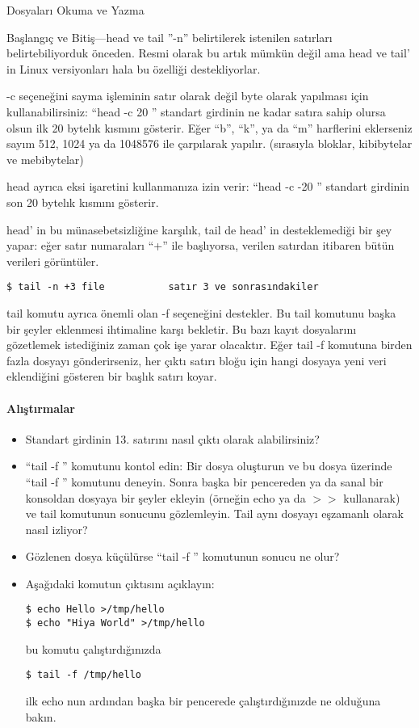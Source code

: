 \begin{section}{Dosyaları Okuma ve Yazma}
\begin{subsection}{Başlangıç ve Bitiş—head ve tail}
”-n” belirtilerek istenilen satırları belirtebiliyorduk önceden. Resmi olarak bu artık mümkün değil ama head ve tail' in Linux versiyonları hala bu özelliği destekliyorlar.

-c seçeneğini sayma işleminin satır olarak değil byte olarak yapılması için kullanabilirsiniz: 
“head -c 20 ” standart girdinin ne kadar satıra sahip olursa olsun ilk 20 bytelık kısmını gösterir. Eğer “b”, “k”, ya da “m” harflerini eklerseniz sayım 512, 1024 ya da 1048576 ile çarpılarak yapılır. (sırasıyla bloklar, kibibytelar ve mebibytelar)

head ayrıca eksi işaretini kullanmanıza izin verir: “head -c -20 ” standart girdinin son 20 bytelık kısmını gösterir.

head' in bu münasebetsizliğine karşılık, tail de head' in desteklemediği bir şey yapar: eğer satır numaraları “+” ile başlıyorsa, verilen satırdan itibaren bütün verileri görüntüler.
\begin{verbatim}
$ tail -n +3 file           satır 3 ve sonrasındakiler
\end{verbatim}

tail komutu ayrıca önemli olan -f seçeneğini destekler. Bu tail komutunu başka bir şeyler eklenmesi ihtimaline karşı bekletir. Bu bazı kayıt dosyalarını gözetlemek istediğiniz zaman çok işe yarar olacaktır. Eğer tail -f komutuna birden fazla dosyayı gönderirseniz, her çıktı satırı bloğu için hangi dosyaya yeni veri eklendiğini gösteren bir başlık satırı koyar.

\paragraph{Alıştırmalar}{
\begin{itemize}
 \item Standart girdinin 13. satırını nasıl çıktı olarak alabilirsiniz?
 \item “tail -f ” komutunu kontol edin: Bir dosya oluşturun ve bu dosya üzerinde “tail -f ” komutunu deneyin. Sonra başka bir pencereden ya da sanal bir konsoldan dosyaya bir şeyler ekleyin (örneğin echo ya da $>>$ kullanarak) ve tail komutunun sonucunu gözlemleyin. Tail aynı dosyayı eşzamanlı olarak nasıl izliyor? 
\item Gözlenen dosya küçülürse “tail -f ” komutunun sonucu ne olur? 
\item Aşağıdaki komutun çıktısını açıklayın:
\begin{verbatim}
$ echo Hello >/tmp/hello 
$ echo "Hiya World" >/tmp/hello
\end{verbatim}
bu komutu çalıştırdığınızda
\begin{verbatim}
$ tail -f /tmp/hello
\end{verbatim}
ilk echo nun ardından başka bir pencerede çalıştırdığınızde ne olduğuna bakın.
\end{itemize}}
\end{subsection}
\end{section}
